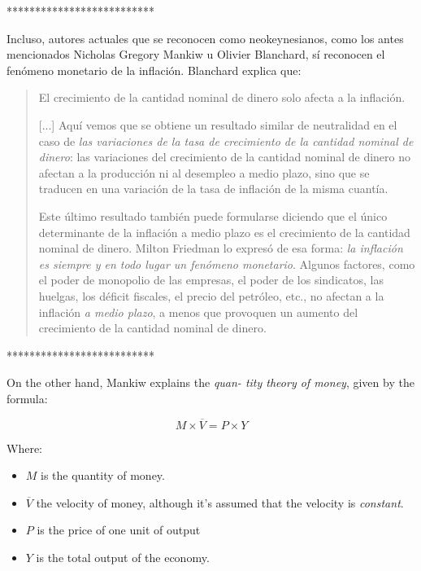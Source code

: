 \documentclass[12pt,a4paper,twoside]{book}
\begin{document}
**************************

Incluso, autores actuales que se reconocen como neokeynesianos, como los antes mencionados Nicholas Gregory Mankiw u Olivier Blanchard, sí reconocen el fenómeno monetario de la inflación. Blanchard explica que:

\begin{quotation}
El crecimiento de la cantidad nominal de dinero solo afecta a la inflación.

[...] Aquí vemos que se obtiene un resultado similar de neutralidad en el caso de \textit{las variaciones de la tasa de crecimiento de la cantidad nominal de dinero}: las variaciones del crecimiento de la cantidad nominal de dinero no afectan a la producción ni al desempleo a medio plazo, sino que se traducen en una variación de la tasa de inflación de la misma cuantía.

Este último resultado también puede formularse diciendo que el único determinante de la inflación a medio plazo es el crecimiento de la cantidad nominal de dinero. Milton Friedman lo expresó de esa forma: \textit{la inflación es siempre y en todo lugar un fenómeno monetario}. Algunos factores, como el poder de monopolio de las empresas, el poder de los sindicatos, las huelgas, los déficit fiscales, el precio del petróleo, etc., no afectan a la inflación \textit{a medio plazo}, a menos que provoquen un aumento del crecimiento de la cantidad nominal de dinero. \cite[pág. 234]{blanchard}
\end{quotation}

**************************

On the other hand, Mankiw explains the \textit{quan-
tity theory of money}, given by the formula:

\begin{equation}\label{QTM}
M \times \overline{V} = P \times Y
\end{equation}

\begin{flushright}
\cite[p.~89]{mankiw:macroeconomics}
\end{flushright}

Where:

\begin{itemize}
\item $ M $ is the quantity of money.
\item $ \overline{V} $ the velocity of money, although it's assumed that the velocity is \textit{constant}.
\item $ P $ is the price of one unit of
output
\item $ Y $ is the total output of the economy.
\end{itemize}
\end{document}
